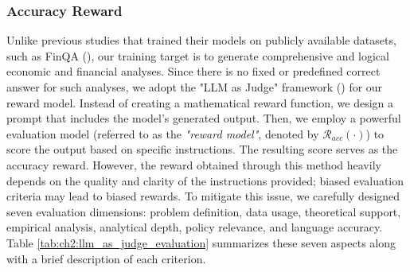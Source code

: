 \subsubsection{Accuracy Reward}

Unlike previous studies that trained their models on publicly available datasets, such as FinQA (\cite{chen2021finqa}), our training target is to generate comprehensive and logical economic and financial analyses. Since there is no fixed or predefined correct answer for such analyses, we adopt the "LLM as Judge" framework (\cite{zheng2023judging}) for our reward model. Instead of creating a mathematical reward function, we design a prompt that includes the model's generated output. Then, we employ a powerful evaluation model (referred to as the \textit{"reward model"}, denoted by $\mathcal{R}_{acc}(\cdot)$) to score the output based on specific instructions. The resulting score serves as the accuracy reward. However, the reward obtained through this method heavily depends on the quality and clarity of the instructions provided; biased evaluation criteria may lead to biased rewards. To mitigate this issue, we carefully designed seven evaluation dimensions: problem definition, data usage, theoretical support, empirical analysis, analytical depth, policy relevance, and language accuracy. Table \ref{tab:ch2:llm_as_judge_evaluation} summarizes these seven aspects along with a brief description of each criterion. 




